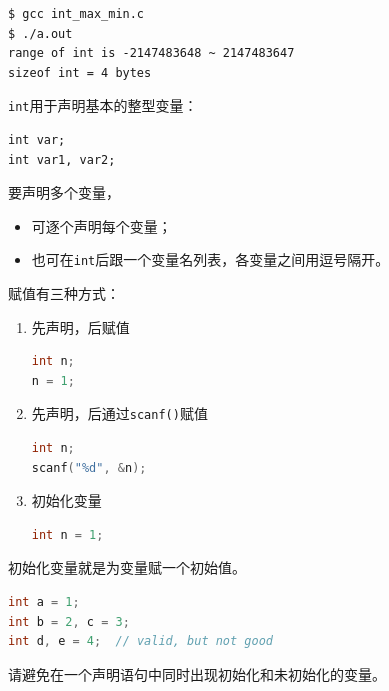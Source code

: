 \begin{frame}[fragile]
\begin{lstlisting}
$ gcc int_max_min.c
$ ./a.out
range of int is -2147483648 ~ 2147483647
sizeof int = 4 bytes
\end{lstlisting}
\end{frame}
%
\begin{frame}[fragile]
\lstinline|int|用于声明基本的整型变量：
\begin{lstlisting}
int var;
int var1, var2;
\end{lstlisting}  \vspace{0.05in}

要声明多个变量，\vspace{0.05in}
\begin{itemize}
\item 可逐个声明每个变量；\\[0.1in]
\item 也可在\lstinline|int|后跟一个变量名列表，各变量之间用逗号隔开。
\end{itemize}

\end{frame}
%
\begin{frame}[fragile]
赋值有三种方式：\vspace{0.05in}

\begin{enumerate}
\item 先声明，后赋值
\begin{lstlisting}[language=c]
int n;
n = 1;
\end{lstlisting}
\item 先声明，后通过\lstinline|scanf()|赋值
\begin{lstlisting}[language=c]
int n;
scanf("%d", &n);
\end{lstlisting} 
\item 初始化变量
\begin{lstlisting}[language=c]
int n = 1;
\end{lstlisting} 
\end{enumerate}
\end{frame}
\begin{frame}[fragile]
初始化变量就是为变量赋一个初始值。
\begin{lstlisting}[language=c]
int a = 1;
int b = 2, c = 3;
int d, e = 4;  // valid, but not good
\end{lstlisting}
请避免在一个声明语句中同时出现初始化和未初始化的变量。
\end{frame}
